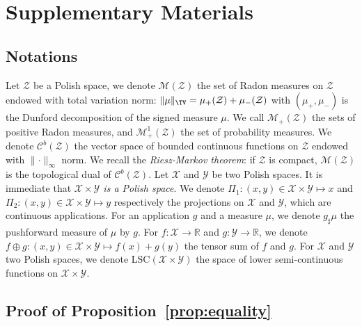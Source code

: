 \section{Supplementary Materials}
\subsection{Notations}
Let $\mathcal{Z}$ be a Polish space, we denote $\mathcal{M}(\mathcal{Z})$ the set of Radon measures on $\mathcal{Z}$ endowed with total variation norm: $\lVert\mu\rVert_{\TV}=\mu_+(\mathcal{Z})+\mu_-(\mathcal{Z})$ with $(\mu_+,\mu_-)$ is the Dunford decomposition of the signed measure $\mu$. We call $\mathcal{M}_+(\mathcal{Z})$ the sets of positive Radon measures, and  $\mathcal{M}^1_+(\mathcal{Z})$ the set of probability measures. We denote $\mathcal{C}^b(\mathcal{Z})$ the vector space of bounded continuous functions on $\mathcal{Z}$ endowed with $\lVert\cdot \rVert_\infty$ norm. We recall the \textit{Riesz-Markov theorem}: if $\mathcal{Z}$ is compact, $\mathcal{M}(\mathcal{Z})$ is the topological dual of $\mathcal{C}^b(\mathcal{Z})$. Let $\mathcal{X}$ and $\mathcal{Y}$ be two Polish spaces. It is immediate  that \textit{$\mathcal{X}\times\mathcal{Y}$ is a Polish space}.  We denote $\Pi_1:(x,y)\in\mathcal{X}\times\mathcal{Y}\mapsto x$ and $\Pi_2:(x,y)\in\mathcal{X}\times\mathcal{Y}\mapsto y$ respectively the projections on $\mathcal{X}$ and  $\mathcal{Y}$, which are continuous applications. For an application $g$ and a measure $\mu$, we denote $g_\sharp\mu$ the pushforward measure of $\mu$ by $g$. For $f:\mathcal{X}\rightarrow\mathbb{R}$ and $g:\mathcal{Y}\rightarrow\mathbb{R}$, we denote $f\oplus g:(x,y)\in\mathcal{X}\times\mathcal{Y}\mapsto f(x)+g(y)$ the tensor sum of $f$ and $g$. For  $\mathcal{X}$ and $\mathcal{Y}$ two Polish spaces, we denote $\text{LSC}(\mathcal{X}\times\mathcal{Y})$ the space of lower semi-continuous functions on $\mathcal{X}\times\mathcal{Y}$.

\subsection{Proof of Proposition~\ref{prop:equality}}
\label{app:equality}

